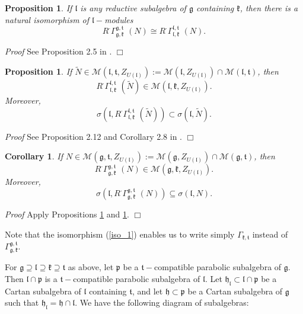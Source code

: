 \documentclass[default]{./styles/svmult}
\newtheorem{cor}[theo]{Corollary}
\newtheorem{prop}[theo]{Proposition}
\renewenvironment{proof}{ \emph{Proof}}{$\Box$}
\renewcommand{\gg}{\mathfrak{g}}
\newcommand{\hh}{\mathfrak{h}}
\newcommand{\kk}{\mathfrak{k}}
\renewcommand{\ll}{\mathfrak{l}}
\newcommand{\pp}{\mathfrak{p}}
\renewcommand{\tt}{\mathfrak{t}}
\begin{document}
\begin{prop}\label{prop:2}
If $\ll$ is any reductive subalgebra of $\gg$ containing $\kk$, then there is a natural isomorphism of $\ll-$modules 
\begin{equation}\label{iso_1}
R^{\cdot}\Gamma_{\gg,\kk}^{\gg,\tt}\,\,(N) \cong R^{\cdot}\Gamma_{\ll,\kk}^{\ll,\tt}\,\,(N).
\end{equation} 
\end{prop}

\begin{proof}
 See Proposition 2.5 in \cite{PZ4}.
\end{proof}

\begin{prop}\label{prop:3}
 If $\tilde{N} \in \mathcal{M}(\ll,\tt,Z_{U(\ll)}):=\mathcal{M}(\ll,Z_{U(\ll)}) \cap \mathcal{M}(\ll,\tt)$, then $$R^{\cdot}\Gamma_{\ll,\kk}^{\ll,\tt}\,\,(\tilde{N}) \in \mathcal{M}(\ll,\kk,Z_{U(\ll)}).$$
Moreover, $$\sigma(\ll,R^{\cdot}\Gamma_{\ll,\kk}^{\ll,\tt}\,\,(\tilde{N})) \subset \sigma(\ll,\tilde{N}).$$
\end{prop}

\begin{proof}
 See Proposition 2.12 and Corollary 2.8 in \cite{Z}.
\end{proof}

\begin{cor}\label{corr:2}
 If $N \in \mathcal{M}(\gg, \tt, Z_{U(\ll)}):=\mathcal{M}(\gg,Z_{U(\ll)}) \cap \mathcal{M}(\gg,\tt)$, then $$R^{\cdot}\Gamma_{\gg,\kk}^{\gg,\tt}\,\,(N) \in \mathcal{M}(\gg,\kk,Z_{U(\ll)}).$$
Moreover, $$\sigma(\ll,R^{\cdot}\Gamma_{\gg,\kk}^{\gg,\tt}\,\,(N)) \subseteq \sigma(\ll,N).$$
\end{cor}
\begin{proof}
 Apply Propositions \ref{prop:2} and \ref{prop:3}.
\end{proof}


Note that the isomorphism (\ref{iso_1}) enables us to write simply $\Gamma_{\kk,\tt}$ instead of $\Gamma_{\gg,\kk}^{\gg,\tt}$. 

For $\gg \supseteq \ll \supseteq \kk \supseteq \tt$ as above, let $\pp$ be a $\tt-$compatible parabolic subalgebra of $\gg$. Then $\ll \cap \pp$ is a $\tt-$compatible parabolic subalgebra of $\ll$. Let $\hh_\ll \subset \ll \cap \pp$ be a Cartan subalgebra of $\ll$ containing $\tt$, and let $\hh \subset \pp$ be a Cartan subalgebra of $\gg$ such that $\hh_\ll = \hh \cap \ll$. We have the following diagram of subalgebras:
% 
\end{document}
